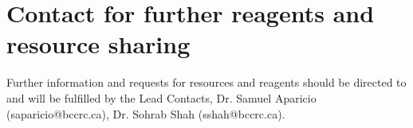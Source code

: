 \documentclass{article}
\makeatletter
\newcommand{\putFigLargCap}[5]
{
\begin{center}
\texttt{[image: \#1]}   
\bigskip
\setbox0\vbox{
\let\caption@rule\relax
\captionof{figure}[#5]{\textbf{#5} #3 \label{#4}}
\global\skip1\lastskip\unskip
\global\setbox1\lastbox

}
\unvbox0
\setbox0\hbox{\unhbox1\unskip\unskip\unpenalty
\global\setbox1\lastbox}
\unvbox1
\vskip\skip1
\end{center}
}
\makeatother
\begin{document}
\section{Contact for further reagents and resource sharing}
Further information and requests for resources and reagents should be directed to and will be fulfilled by the Lead Contacts,
Dr. Samuel Aparicio (saparicio@bccrc.ca), Dr. Sohrab Shah (sshah@bccrc.ca).


 



\begin{comment}
\putFigLargCap{figures/supp/fig_S1_OverviewofexperimentaldesignandPDXgrowthcurves}{1}
{
}{ Detailed }{Detailed Overview of experimental design and PDX growth curves}
(A)	In the top panel, the pink dishes represent the 184-hTERT L9 WT cell line 
being serially passaged. 
The shown passage numbers were subjected to single cell whole genome sequencing. 
Initial, mid, and late time points were selected for expression analysis and cells were sequenced at single cell RNA level on the 10X genomics platform. 
The below orange dishes represent home-made 184-hTERT L9 95.22; p53 null cell line by CRISPR technology. 
Parallel branches SA906a and SA906b were derived from the same tenth passage to measure the extent of heterogeneity observed in the same serially passaged baseline P53 null cells. 
Initial, mid and late timepoints were also selected from both the branches for single cell whole genome sequencing (DLP+) and single cell RNA sequencing for  expression analysis (10X genomics).
(B)Western blot confirming knock out of Tp53 from 184-hTERT L9 WT cell line.
(C) The first schematic is showing the sketch of the experimental strategy. The patient’s breast tumours were taken and mechanically desegregated into small clumps and single cells. 
They were then re-transplanted into immuno-compromised mice to generate passage one (X1) of the patient derived xenograft (PDX). 
When the tumours reached the size of 1000 cubic millimeter, the tumours were harvested and again mechanically desegregated into tumour clumps and/or single cells. 
They were re-transplanted into a new set of mice to generate the next passage of PDX. Here, each big dark grey circle is representing the group of mice transplanted in each passage. 
Up to ten passages of PDX were derived by mechanical desegregation and serial re-transplanted of PDX tumors. 
The lower two schematics are showing the actual sampling done from SA609 in (TNBC) and SA532 (HER2+). 

\end{comment}
\end{document}
